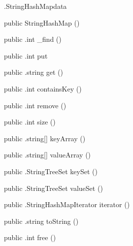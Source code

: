 \begin{CrexxClass}{.StringHashMap}{data}

  \begin{Hierarchy}
  \end{Hierarchy}

  \begin{Members}

    \Factory
      {public}
      {StringHashMap}
      {()}

    \Method
      {public}
      {.int}
      {\_find}
      {()}

    \Method
      {public}
      {.int}
      {put}
      {}

    \Method
      {public}
      {.string}
      {get}
      {()}

    \Method
      {public}
      {.int}
      {containsKey}
      {()}

    \Method
      {public}
      {.int}
      {remove}
      {()}

    \Method
      {public}
      {.int}
      {size}
      {()}

    \Method
      {public}
      {.string[]}
      {keyArray}
      {()}

    \Method
      {public}
      {.string[]}
      {valueArray}
      {()}

    \Method
      {public}
      {.StringTreeSet}
      {keySet}
      {()}

    \Method
      {public}
      {.StringTreeSet}
      {valueSet}
      {()}

    \Method
      {public}
      {.StringHashMapIterator}
      {iterator}
      {()}

    \Method
      {public}
      {.string}
      {toString}
      {()}

    \Method
      {public}
      {.int}
      {free}
      {()}

  \end{Members}
\end{CrexxClass}

